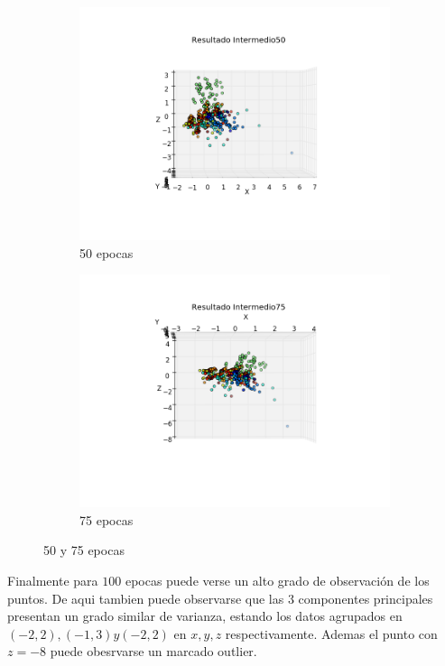\begin{figure}[h!]
\centering
\begin{subfigure}{.5\textwidth}
  \centering
  \includegraphics[width=.9\linewidth]{convergencia_oja/2.png}
  \caption{50 epocas}
  \label{fig:sub1}
\end{subfigure}%
\begin{subfigure}{.5\textwidth}
  \centering
  \includegraphics[width=.9\linewidth]{convergencia_oja/3.png}
  \caption{75 epocas}
  \label{fig:sub2}
\end{subfigure}
\caption{50 y 75 epocas}
\label{fig:test}
\end{figure}

Finalmente para $100$ epocas puede verse un alto grado de observación de los puntos. De aqui tambien puede observarse que las 3 componentes principales presentan un grado similar de varianza, estando los datos agrupados en $(-2,2), (-1,3) y (-2,2)$ en $x,y,z$ respectivamente. Ademas el punto con $z=-8$ puede obesrvarse un marcado outlier.


